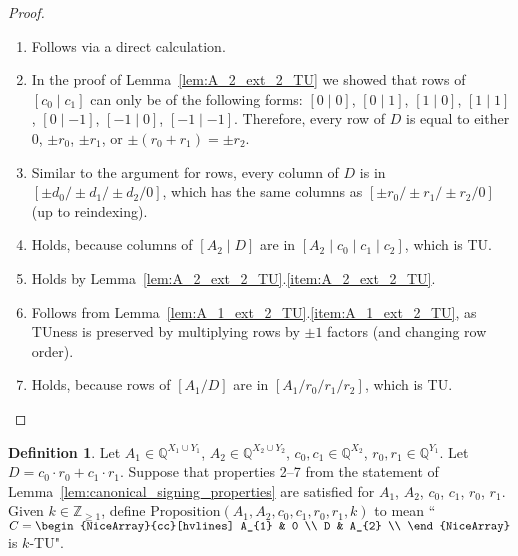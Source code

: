 \documentclass{article}
\theoremstyle{definition}
\newtheorem{definition}{Definition}
\begin{document}
\begin{proof}
    \begin{enumerate}
        \item Follows via a direct calculation.
        \item In the proof of Lemma~\ref{lem:A_2_ext_2_TU} we showed that rows of $[c_{0} \mid c_{1}]$ can only be of the following forms: $[0 \mid 0]$, $[0 \mid 1]$, $[1 \mid 0]$, $[1 \mid 1]$, $[0 \mid -1]$, $[-1 \mid 0]$, $[-1 \mid -1]$. Therefore, every row of $D$ is equal to either $0$, $\pm r_{0}$, $\pm r_{1}$, or $\pm (r_{0} + r_{1}) = \pm r_{2}$.
        \item Similar to the argument for rows, every column of $D$ is in $[\pm d_{0} / \pm d_{1} / \pm d_{2} / 0]$, which has the same columns as $[\pm r_{0} / \pm r_{1} / \pm r_{2} / 0]$ (up to reindexing).
        \item Holds, because columns of $[A_{2} \mid D]$ are in $[A_{2} \mid c_{0} \mid c_{1} \mid c_{2}]$, which is TU.
        \item Holds by Lemma~\ref{lem:A_2_ext_2_TU}.\ref{item:A_2_ext_2_TU}.
        \item Follows from Lemma~\ref{lem:A_1_ext_2_TU}.\ref{item:A_1_ext_2_TU}, as TUness is preserved by multiplying rows by $\pm 1$ factors (and changing row order).
        \item Holds, because rows of $[A_{1} / D]$ are in $[A_{1} / r_{0} / r_{1} / r_{2}]$, which is TU.
    \end{enumerate}
\end{proof}

\begin{definition}\label{def:alt_sum_constr}
    Let $A_{1} \in \mathbb{Q}^{X_{1} \cup Y_{1}}$, $A_{2} \in \mathbb{Q}^{X_{2} \cup Y_{2}}$, $c_{0}, c_{1} \in \mathbb{Q}^{X_{2}}$, $r_{0}, r_{1} \in \mathbb{Q}^{Y_{1}}$. Let $D = c_{0} \cdot r_{0} + c_{1} \cdot r_{1}$. Suppose that properties 2--7 from the statement of Lemma~\ref{lem:canonical_signing_properties} are satisfied for $A_{1}$, $A_{2}$, $c_{0}$, $c_{1}$, $r_{0}$, $r_{1}$. Given $k \in \mathbb{Z}_{\geq 1}$, define $\mathrm{Proposition}(A_{1}, A_{2}, c_{0}, c_{1}, r_{0}, r_{1}, k)$ to mean ``$C = \begin{NiceArray}{cc}[hvlines] A_{1} & 0 \\ D & A_{2} \\ \end{NiceArray}$ is $k$-TU".
\end{definition}
\end{document}
